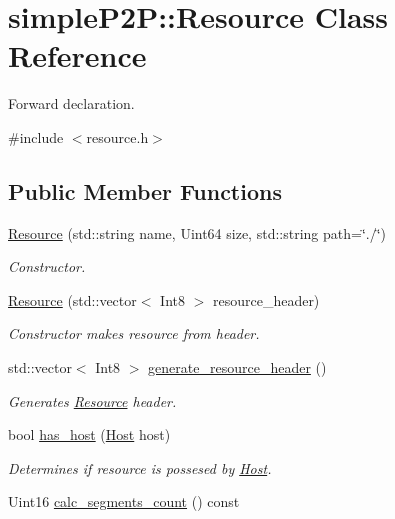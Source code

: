 \hypertarget{classsimpleP2P_1_1Resource}{}\section{simple\+P2P\+:\+:Resource Class Reference}
\label{classsimpleP2P_1_1Resource}


Forward declaration.  




{\ttfamily \#include $<$resource.\+h$>$}

\subsection*{Public Member Functions}
\begin{DoxyCompactItemize}
\item 
\hyperlink{classsimpleP2P_1_1Resource_a0aed54e6cf7d3a5fa2c53fe3b3b57d19}{Resource} (std\+::string name, Uint64 size, std\+::string path=\char`\"{}./\char`\"{})
\begin{DoxyCompactList}\small\item\em Constructor. \end{DoxyCompactList}\item 
\hyperlink{classsimpleP2P_1_1Resource_a06890bc51f5d591aa562fb009f915ea4}{Resource} (std\+::vector$<$ Int8 $>$ resource\+\_\+header)
\begin{DoxyCompactList}\small\item\em Constructor makes resource from header. \end{DoxyCompactList}\item 
std\+::vector$<$ Int8 $>$ \hyperlink{classsimpleP2P_1_1Resource_ad2f3883ae1993c7788aecf34b8fb8470}{generate\+\_\+resource\+\_\+header} ()
\begin{DoxyCompactList}\small\item\em Generates \hyperlink{classsimpleP2P_1_1Resource}{Resource} header. \end{DoxyCompactList}\item 
bool \hyperlink{classsimpleP2P_1_1Resource_ac3c067c66ef0db0a25a7904a83f50e3d}{has\+\_\+host} (\hyperlink{classsimpleP2P_1_1Host}{Host} host)
\begin{DoxyCompactList}\small\item\em Determines if resource is possesed by \hyperlink{classsimpleP2P_1_1Host}{Host}. \end{DoxyCompactList}\item 
Uint16 \hyperlink{classsimpleP2P_1_1Resource_a4bbfde4d1e25c62ae4da0e6dfd64900b}{calc\+\_\+segments\+\_\+count} () const

\end{DoxyCompactItemize}
